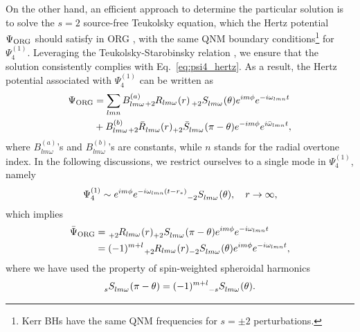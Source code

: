 \documentclass[aps,prd,amsmath,floats,floatfix, twocolumn,
superscriptaddress,nofootinbib,showpacs]{revtex4-1}
\newcommand{\hertz}{\Psi_{\rm ORG}}
\newcommand{\hertzbar}{\bar{\Psi}_{\rm ORG}}
\begin{document}
On the other hand, an efficient approach to determine the particular solution is to solve the $s=2$ source-free Teukolsky equation, which the Hertz potential $\hertz$ should satisfy in ORG \cite{1975PhRvD..11.2042C}, with the same QNM boundary conditions\footnote{Kerr BHs have the same QNM frequencies for $s=\pm 2$ perturbations.} for $\Psi_4^{(1)}$. Leveraging the Teukolsky-Starobinsky relation \cite{Starobinsky:1973aij,Teukolsky:1974yv}, we ensure that the solution consistently complies with Eq.~\eqref{eq:psi4_hertz}. As a result, the Hertz potential associated with $\Psi_4^{(1)}$ can be written as \cite{Berti:2005ys}
\begin{align}
    \hertz &= \sum_{lmn} B_{lm\omega}^{(a)}  \tensor[_{+2}]{{R_{lm\omega}}}{} (r)\, \tensor[_{+2}]{S}{_{lm\omega}}(\theta) e^{im\phi} e^{-i \omega_{lmn}t}  \notag \\
            & + B_{lm\omega}^{(b)} \tensor[_{+2}]{{\bar{R}}}{_{lm\omega}} (r) \tensor[_{+2}]{\bar{S}}{_{lm\omega}}(\pi-\theta) e^{-im\phi} e^{i \bar{\omega}_{lmn}t}, \label{eq:hertz_general_solution}
\end{align}
where $B_{lm\omega}^{(a)}$'s and $B_{lm\omega}^{(b)}$'s are constants, while $n$ stands for the radial overtone index. In the following discussions, we restrict ourselves to a single mode in $\Psi_4^{(1)}$, namely
\begin{align}
    \Psi_4^{(1)}\sim e^{i m \phi} e^{-i \omega_{lmn}(t-r_*)} \tensor[_{-2}]{S}{_{lm\omega}}(\theta), \quad r\to \infty,
\end{align}
which implies  
\begin{align}
    \hertzbar &= \tensor[_{+2}]{{R_{lm\omega}}}{} (r) \tensor[_{+2}]{S}{_{lm\omega}}(\pi-\theta) e^{im\phi} e^{-i \omega_{lmn}t} \notag \\
    &=(-1)^{m+l}\tensor[_{+2}]{{R_{lm\omega}}}{} (r) \tensor[_{-2}]{S}{_{lm\omega}}(\theta) e^{im\phi} e^{-i \omega_{lmn}t}, \label{eq:hertz_bar_qnm}
\end{align}
where we have used the property of spin-weighted spheroidal harmonics \cite{Nichols:2012jn}
\begin{align}
    \tensor[_{s}]{S}{_{lm\omega}}(\pi-\theta) = (-1)^{m+l}  \tensor[_{-s}]{S}{_{lm\omega}}(\theta).
\end{align}
\end{document}
